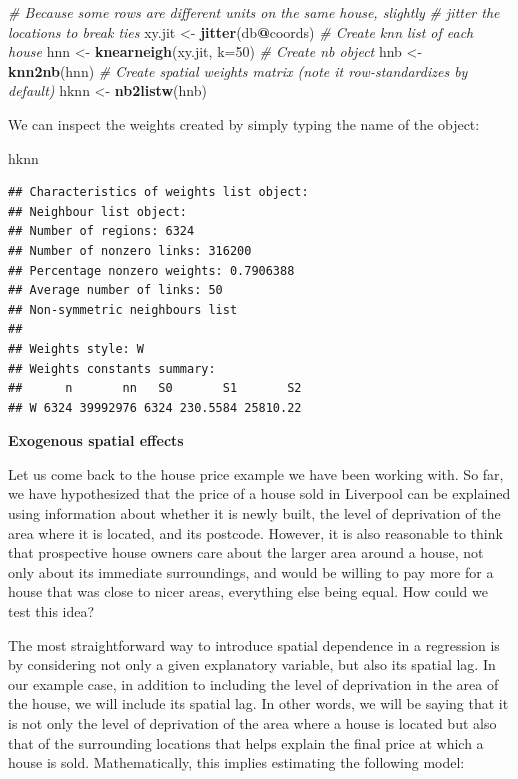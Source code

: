 \documentclass[]{book}
\newenvironment{Shaded}{\begin{snugshade}}{\end{snugshade}}
\newcommand{\KeywordTok}[1]{\textcolor[rgb]{0.13,0.29,0.53}{\textbf{#1}}}
\newcommand{\DataTypeTok}[1]{\textcolor[rgb]{0.13,0.29,0.53}{#1}}
\newcommand{\DecValTok}[1]{\textcolor[rgb]{0.00,0.00,0.81}{#1}}
\newcommand{\StringTok}[1]{\textcolor[rgb]{0.31,0.60,0.02}{#1}}
\newcommand{\CommentTok}[1]{\textcolor[rgb]{0.56,0.35,0.01}{\textit{#1}}}
\newcommand{\OperatorTok}[1]{\textcolor[rgb]{0.81,0.36,0.00}{\textbf{#1}}}
\newcommand{\NormalTok}[1]{#1}
\begin{document}
\begin{Shaded}
\begin{Highlighting}[]
\CommentTok{# Because some rows are different units on the same house, slightly}
\CommentTok{# jitter the locations to break ties}
\NormalTok{xy.jit <-}\StringTok{ }\KeywordTok{jitter}\NormalTok{(db}\OperatorTok{@}\NormalTok{coords)}
\CommentTok{# Create knn list of each house}
\NormalTok{hnn <-}\StringTok{ }\KeywordTok{knearneigh}\NormalTok{(xy.jit, }\DataTypeTok{k=}\DecValTok{50}\NormalTok{)}
\CommentTok{# Create nb object}
\NormalTok{hnb <-}\StringTok{ }\KeywordTok{knn2nb}\NormalTok{(hnn)}
\CommentTok{# Create spatial weights matrix (note it row-standardizes by default)}
\NormalTok{hknn <-}\StringTok{ }\KeywordTok{nb2listw}\NormalTok{(hnb)}
\end{Highlighting}
\end{Shaded}

We can inspect the weights created by simply typing the name of the
object:

\begin{Shaded}
\begin{Highlighting}[]
\NormalTok{hknn}
\end{Highlighting}
\end{Shaded}

\begin{verbatim}
## Characteristics of weights list object:
## Neighbour list object:
## Number of regions: 6324 
## Number of nonzero links: 316200 
## Percentage nonzero weights: 0.7906388 
## Average number of links: 50 
## Non-symmetric neighbours list
## 
## Weights style: W 
## Weights constants summary:
##      n       nn   S0       S1       S2
## W 6324 39992976 6324 230.5584 25810.22
\end{verbatim}

\textbf{Exogenous spatial effects}

Let us come back to the house price example we have been working with.
So far, we have hypothesized that the price of a house sold in Liverpool
can be explained using information about whether it is newly built, the
level of deprivation of the area where it is located, and its postcode.
However, it is also reasonable to think that prospective house owners
care about the larger area around a house, not only about its immediate
surroundings, and would be willing to pay more for a house that was
close to nicer areas, everything else being equal. How could we test
this idea?

The most straightforward way to introduce spatial dependence in a
regression is by considering not only a given explanatory variable, but
also its spatial lag. In our example case, in addition to including the
level of deprivation in the area of the house, we will include its
spatial lag. In other words, we will be saying that it is not only the
level of deprivation of the area where a house is located but also that
of the surrounding locations that helps explain the final price at which
a house is sold. Mathematically, this implies estimating the following
model:
\end{document}
